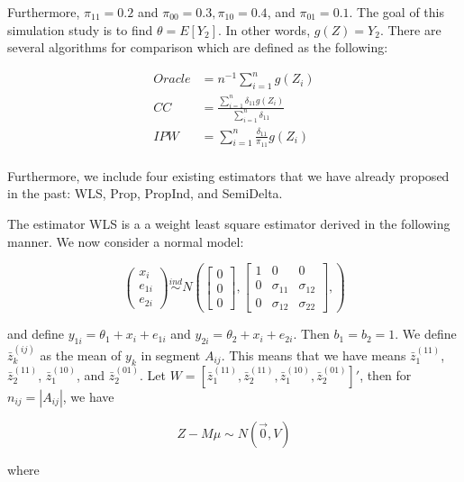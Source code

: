 \documentclass[12pt]{article}
\begin{document}
Furthermore, $\pi_{11} = 0.2$ and $\pi_{00} = 0.3, \pi_{10} = 0.4$, and 
$\pi_{01} = 0.1$.
The goal of this simulation study is to find $\theta = E[Y_2]$. In other words,
$g(Z) = Y_2$. There are several algorithms for comparison which are defined 
as the following:

\begin{align*}
  Oracle &= n^{-1} \sum_{i = 1}^n g(Z_i)\\
  CC &= \frac{\sum_{i = 1}^n \delta_{11} g(Z_i)}{\sum_{i = 1}^n \delta_{11}} \\
  IPW &= \sum_{i = 1}^n \frac{\delta_{11}}{\pi_{11}} g(Z_i)\\
\end{align*}

Furthermore, we include four existing estimators that we have already 
proposed in the past: WLS, Prop, PropInd, and SemiDelta. 

The estimator WLS is a a weight least square estimator derived in the 
following manner. We now consider a normal model:

    \[ 
      \begin{pmatrix}
        x_i \\ e_{1i} \\ e_{2i}
      \end{pmatrix} \stackrel{ind}{\sim}
      N \left(
      \begin{bmatrix}
        0 \\ 0 \\ 0
      \end{bmatrix},
      \begin{bmatrix}
        1 & 0 & 0 \\
        0 & \sigma_{11} & \sigma_{12} \\ 
        0 & \sigma_{12} & \sigma_{22}
      \end{bmatrix},
      \right)
    \]

    and define $y_{1i} = \theta_1 + x_i + e_{1i}$ and $y_{2i} = \theta_2 + x_i
    + e_{2i}$. Then $b_1 = b_2 = 1$. We define $\bar z_k^{(ij)}$ as the mean of
    $y_k$ in segment $A_{ij}$. This means that we have means $\bar z_1^{(11)}$,
    $\bar z_2^{(11)}$, $\bar z_1^{(10)}$, and $\bar z_2^{(01)}$. Let $W = [\bar
    z_1^{(11)}, \bar z_2^{(11)}, \bar z_1^{(10)}, \bar z_2^{(01)}]'$, then for
    $n_{ij} = |A_{ij}|$, we have

    \[Z - M \mu \sim N(\vec 0, V)\]

    where 
\end{document}

